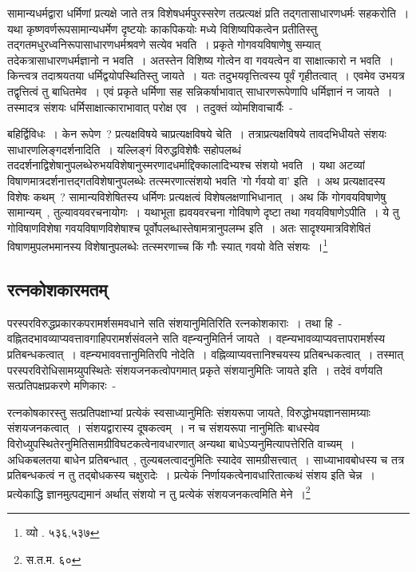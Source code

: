 		सामान्यधर्मद्वारा धर्मिणां प्रत्यक्षे जाते तत्र विशेषधर्मपुरस्सरेण तत्प्रत्यक्षं प्रति तद्गतासाधारणधर्मः सहकरोति~। यथा कृष्णवर्णरूपसामान्यधर्मेण दृष्टयोः काकपिकयोः मध्ये विशिष्यपिकत्वेन प्रतीतिस्तु तद्गतमधुरध्वनिरूपासाधारणधर्मश्रवणे सत्येव भवति~। प्रकृते गोगवयविषाणेषु सम्यात् तदेकत्रासाधारणधर्मज्ञानो न भवति~। अतस्तेन विशिष्य गोत्वेन वा गवयत्वेन वा साक्षात्कारो न भवति~। किन्त्वत्र तदाश्रयतया धर्मिद्वयोपस्थितिस्तु जायते~। यतः तदुभयवृत्तित्वस्य पूर्वं गृहीतत्वात्~। एवमेव उभयत्र तद्वृत्तित्वं तु बाधितमेव~। एवं प्रकृते धर्मिणा सह सन्निकर्षाभावात् साधारणरूपेणापि धर्मिज्ञानं न जायते~। तस्मादत्र संशयः धर्मिसाक्षात्काराभावात् परोक्ष एव~। तदुक्तं व्योमशिवाचार्यैः~-

		{\fontsize{11.7}{0}\selectfont\s बहिर्द्विविधः~। केन रूपेण~?‌ प्रत्यक्षविषये चाप्रत्यक्षविषये चेति~। तत्राप्रत्यक्षविषये तावदभिधीयते संशयः साधारणलिङ्गदर्शनादिति~। यल्लिङ्गं विरुद्धविशेषैः‌ सहोपलब्धं तददर्शनाद्विशेषानुपलब्धेरुभयविशेषानुस्मरणादधर्माद्दिक्कालादिभ्यश्च संशयो भवति~। यथा अटव्यां‌ विषाणमात्रदर्शनात्तद्गतविशेषानुपलब्धेः तत्स्मरणात्संशयो भवति 'गो र्गवयो वा' इति~। अथ प्रत्यक्षादस्य विशेषः कथम्~? सामान्यविशेषितस्य धर्मिणः प्रत्यक्षत्वं विशेषलक्षणाभिधानात्~। अथ किं गोगवयविषाणेषु सामान्यम्~, तुल्यावयवरचनायोगः~। यथाभूता ह्यवयवरचना गोविषाणे दृष्टा तथा गवयविषाणेऽपीति~। ये तु गोविषाणविशेषा गवयविषाणविशेषाश्च पूर्वोपलब्धास्तेषामत्रानुपलम्भ इति~। अतः सादृश्यमात्रविशेषितं विषाणमुपलभमानस्य विशेषानुपलब्धेः तत्स्मरणाच्च किं गौः स्यात् गवयो वेति संशयः~।\footnote{व्यो . ५३६,५३७}}

		\subsection{रत्नकोशकारमतम्}

		परस्परविरुद्धप्रकारकपरामर्शसमवधाने सति संशयानुमितिरिति रत्नकोशकाराः~। तथा हि~- वह्नितदभावव्याप्यवत्तावगाहिपरामर्शसंवलने सति वह्न्यनुमितिर्न जायते~। वह्न्यभावव्याप्यवत्तापरामर्शस्य प्रतिबन्धकत्वात्~। वह्न्यभाववत्तानुमितिरपि नोदेति~। वह्निव्याप्यवत्तानिश्चयस्य प्रतिबन्धकत्वात्~। तस्मात् परस्परविरोधिसामग्र्युपस्थितेः संशयजनकत्वोपगमात् प्रकृते संशयानुमितिः जायते इति~। तदेवं वर्णयति सत्प्रतिपक्षप्रकरणे मणिकारः~-

		{\fontsize{11.7}{0}\selectfont\s रत्नकोषकारस्तु सत्प्रतिपक्षाभ्यां प्रत्येकं स्वसाध्यानुमितिः संशयरूपा जायते, विरुद्धोभयज्ञानसामग्र्याः संशयजनकत्वात्~। संशयद्वारास्य दूषकत्वम्~। न च संशयरूपा नानुमितिः बाधस्येव विरोध्युपस्थितेरनुमितिसामग्रीविघटकत्वेनावधारणात् अन्यथा बाधेऽप्यनुमित्यापत्तेरिति वाच्यम्~। अधिकबलतया बाधेन प्रतिबन्धात्~, तुल्यबलत्वादनुमितिः स्यादेव सामग्रीसत्त्वात्~। साध्याभावबोधस्य च तत्र प्रतिबन्धकत्वं न तु तद्बोधकस्य चक्षुरादेः~। प्रत्येकं निर्णायकत्वेनावधारितात्कथं संशय इति चेन्न~। प्रत्येकाद्धि ज्ञानमुत्पद्यमानं अर्थात् संशयो न तु प्रत्येकं संशयजनकत्वमिति मेने~।\footnote{स.त.म. ६०}}


